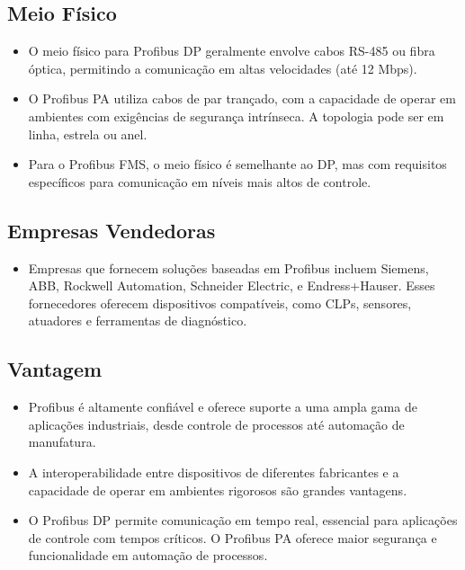 \documentclass[a4paper,11pt]{article} %
\begin{document}
\subsection{Meio Físico}
\begin{itemize}
    \item O meio físico para Profibus DP geralmente envolve cabos RS-485 ou fibra óptica, permitindo a comunicação em altas velocidades (até 12 Mbps).
    \item O Profibus PA utiliza cabos de par trançado, com a capacidade de operar em ambientes com exigências de segurança intrínseca. A topologia pode ser em linha, estrela ou anel.
    \item Para o Profibus FMS, o meio físico é semelhante ao DP, mas com requisitos específicos para comunicação em níveis mais altos de controle.
\end{itemize}

\subsection{Empresas Vendedoras}
\begin{itemize}
    \item Empresas que fornecem soluções baseadas em Profibus incluem Siemens, ABB, Rockwell Automation, Schneider Electric, e Endress+Hauser. Esses fornecedores oferecem dispositivos compatíveis, como CLPs, sensores, atuadores e ferramentas de diagnóstico.
\end{itemize}

\subsection{Vantagem}
\begin{itemize}
    \item Profibus é altamente confiável e oferece suporte a uma ampla gama de aplicações industriais, desde controle de processos até automação de manufatura.
    \item A interoperabilidade entre dispositivos de diferentes fabricantes e a capacidade de operar em ambientes rigorosos são grandes vantagens.
    \item O Profibus DP permite comunicação em tempo real, essencial para aplicações de controle com tempos críticos. O Profibus PA oferece maior segurança e funcionalidade em automação de processos.
\end{itemize}
\end{document}
